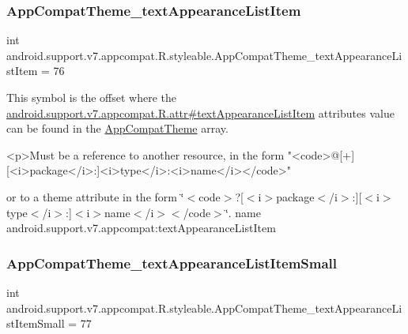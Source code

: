 \subsubsection{\texorpdfstring{App\+Compat\+Theme\+\_\+text\+Appearance\+List\+Item}{AppCompatTheme\_textAppearanceListItem}}
{\footnotesize\ttfamily int android.\+support.\+v7.\+appcompat.\+R.\+styleable.\+App\+Compat\+Theme\+\_\+text\+Appearance\+List\+Item = 76\hspace{0.3cm}{\ttfamily [static]}}

This symbol is the offset where the \hyperlink{classandroid_1_1support_1_1v7_1_1appcompat_1_1R_1_1attr_ae0a52709ab8a3d80bcf2f6c11eea15f4}{android.\+support.\+v7.\+appcompat.\+R.\+attr\#text\+Appearance\+List\+Item} attribute\textquotesingle{}s value can be found in the \hyperlink{classandroid_1_1support_1_1v7_1_1appcompat_1_1R_1_1styleable_a5c42f89e8a410c323be34208d75c430b}{App\+Compat\+Theme} array.

\begin{DoxyVerb}      <p>Must be a reference to another resource, in the form "<code>@[+][<i>package</i>:]<i>type</i>:<i>name</i></code>"
\end{DoxyVerb}
 or to a theme attribute in the form \char`\"{}$<$code$>$?\mbox{[}$<$i$>$package$<$/i$>$\+:\mbox{]}\mbox{[}$<$i$>$type$<$/i$>$\+:\mbox{]}$<$i$>$name$<$/i$>$$<$/code$>$\char`\"{}.  name android.\+support.\+v7.\+appcompat\+:text\+Appearance\+List\+Item \mbox{\label{classandroid_1_1support_1_1v7_1_1appcompat_1_1R_1_1styleable_a29f596f618045a5601a94a5dcc66946d}} 
\subsubsection{\texorpdfstring{App\+Compat\+Theme\+\_\+text\+Appearance\+List\+Item\+Small}{AppCompatTheme\_textAppearanceListItemSmall}}
{\footnotesize\ttfamily int android.\+support.\+v7.\+appcompat.\+R.\+styleable.\+App\+Compat\+Theme\+\_\+text\+Appearance\+List\+Item\+Small = 77\hspace{0.3cm}{\ttfamily [static]}}


